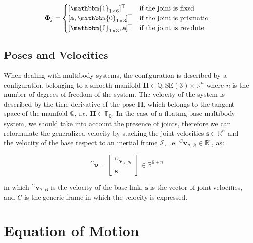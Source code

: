 \begin{equation}
    \label{eqn:subspace}
    \boldsymbol{\Phi} _j =
    \begin{cases}
        [\mathbbm{0}_{1 \times 6}] ^\top             & \text{if the joint is fixed}     \\
        [\mathbf{a}, \mathbbm{0}_{1 \times 3}] ^\top & \text{if the joint is prismatic} \\
        [\mathbbm{0}_{1 \times 3}, \mathbf{a}] ^\top & \text{if the joint is revolute}
    \end{cases}
\end{equation}


\subsection{Poses and Velocities}

When dealing with multibody systems, the configuration is described by a configuration belonging to a smooth manifold $\mathbf{H} \in \mathbb{Q} : \mathrm{SE}(3) \times \mathbb{R}^n$ where $n$ is the number of degrees of freedom of the system. The velocity of the system is described by the time derivative of the pose $\mathbf{H}$, which belongs to the tangent space of the manifold $\mathbb{Q}$, i.e. $\dot{\mathbf{H}} \in \mathbb{T}_{\mathbb{Q}}$. In the case of a floating-base multibody system, we should take into account the presence of joints, therefore we can reformulate the generalized velocity by stacking the joint velocities $\dot{\mathbf{s}} \in \mathbb{R}^n$ and the velocity of the base respect to an inertial frame $\mathcal{I}$, i.e. ${}^C\mathbf{v}_{\mathcal{I},\mathcal{B}} \in \mathbb{R}^6$, as:

\begin{equation}
    {}^C \boldsymbol{\nu} =
    \begin{bmatrix}
        {}^C \mathbf{v}_{\mathcal{I},\mathcal{B}} \\
        \dot{\mathbf{s}}
    \end{bmatrix} \in \mathbb{R}^{6+n}
\end{equation}

in which ${}^C \mathbf{v}_{\mathcal{I},B}$ is the velocity of the base link, $\dot{\mathbf{s}}$ is the vector of joint velocities, and $C$ is the generic frame in which the velocity is expressed.


\section{Equation of Motion}
\label{sec:back_eom}

